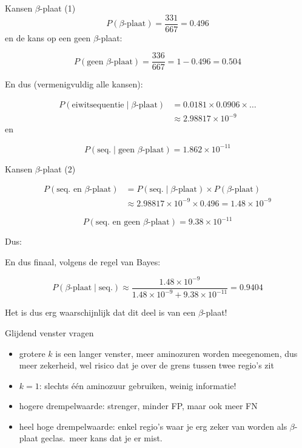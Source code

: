 \documentclass[handout]{beamer}
\begin{document}
\begin{frame}{Kansen $\beta$-plaat (1)}
$$
P(\beta\text{-plaat}) = \frac{331}{667} = 0.496
$$
\pause
en de kans op een geen $\beta$-plaat:

$$
P(\text{geen }\beta\text{-plaat}) = \frac{336}{667} = 1 - 0.496 = 0.504
$$

\pause

En dus (vermenigvuldig alle kansen):

\begin{align*}
P(\text{eiwitsequentie} \mid \text{$\beta$-plaat}) &= 0.0181\times 0.0906\times \ldots \\
& \approx 2.98817\times 10^{-9}
\end{align*}
\pause
en

$$
P(\text{seq.} \mid \text{geen }\text{$\beta$-plaat}) = 1.862\times 10^{-11}
$$

\end{frame}

\begin{frame}{Kansen $\beta$-plaat (2)}

\begin{align*}
P(\text{seq.\ en } \text{$\beta$-plaat}) &= P(\text{seq.} \mid \text{$\beta$-plaat}) \times P(\text{$\beta$-plaat}) \\
& \approx 2.98817\times 10^{-9} \times 0.496 = 1.48\times 10^{-9}
\end{align*}

$$
P(\text{seq.\ en } \text{geen $\beta$-plaat}) = 9.38\times 10^{-11}
$$

\pause

Dus:

En dus finaal, volgens de regel van Bayes:

$$
P( \text{$\beta$-plaat} \mid \text{seq.}) \approx \frac{1.48\times 10^{-9}}{1.48\times 10^{-9}+9.38\times 10^{-11}}=0.9404
$$

Het is dus erg waarschijnlijk dat dit deel is van een $\beta$-plaat!

\end{frame}

\begin{frame}{Glijdend venster vragen}
\begin{itemize}
\item grotere $k$ is een langer venster, meer aminozuren worden meegenomen, dus meer zekerheid, wel risico dat je over de grens tussen twee regio's zit
\item $k=1$: slechts \'e\'en aminozuur gebruiken, weinig informatie!
\item hogere drempelwaarde: strenger, minder FP, maar ook meer FN
\item heel hoge drempelwaarde: enkel regio's waar je erg zeker van worden als $\beta$-plaat geclas.\ meer kans dat je er mist.
\end{itemize}
\end{frame}
\end{document}
